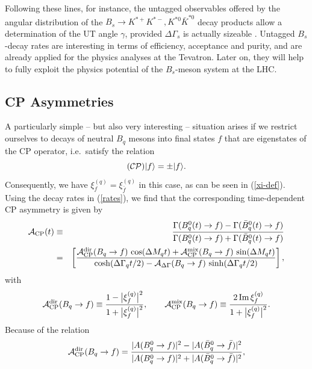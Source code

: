 \documentclass[12pt]{article}
\begin{document}
Following these lines, for instance,  the untagged observables offered by 
the angular distribution of the $B_s\to K^{*+}K^{*-}, K^{*0}\bar K^{*0}$ decay 
products allow a determination of the UT angle $\gamma$, 
provided $\Delta\Gamma_s$ is 
actually sizeable \cite{FD-CP}. Untagged $B_s$-decay rates are interesting in 
terms of efficiency, acceptance and purity, and are already applied for the physics
analyses at the Tevatron. Later on, they will help to fully exploit the physics 
potential of the $B_s$-meson system at the LHC. 

 


%
%
%
\subsection{CP Asymmetries}\label{subsec:CPasym}
%
%
%
A particularly simple -- but also very interesting  -- situation arises 
if we restrict ourselves to decays of neutral $B_q$ mesons 
into final states $f$ that are eigenstates of the CP operator, i.e.\
satisfy the relation 
\begin{equation}\label{CP-eigen}
({\cal CP})|f\rangle=\pm |f\rangle. 
\end{equation}
Consequently, we have $\xi_f^{(q)}=\xi_{\bar f}^{(q)}$ in this case, 
as can be seen in (\ref{xi-def}). Using the decay rates in (\ref{rates}), 
we find that the corresponding time-dependent CP asymmetry is given by
\begin{eqnarray}
{\cal A}_{\rm CP}(t)&\equiv&\frac{\Gamma(B^0_q(t)\to f)-
\Gamma(\bar B^0_q(t)\to f)}{\Gamma(B^0_q(t)\to f)+
\Gamma(\bar B^0_q(t)\to f)}\nonumber\\
&=&\left[\frac{{\cal A}_{\rm CP}^{\rm dir}(B_q\to f)\,\cos(\Delta M_q t)+
{\cal A}_{\rm CP}^{\rm mix}(B_q\to f)\,\sin(\Delta 
M_q t)}{\cosh(\Delta\Gamma_qt/2)-{\cal A}_{\rm 
\Delta\Gamma}(B_q\to f)\,\sinh(\Delta\Gamma_qt/2)}\right],\label{ee6}
\end{eqnarray}
with
\begin{equation}\label{CPV-OBS}
{\cal A}^{\mbox{{\scriptsize dir}}}_{\mbox{{\scriptsize CP}}}(B_q\to f)\equiv
\frac{1-\bigl|\xi_f^{(q)}\bigr|^2}{1+\bigl|\xi_f^{(q)}\bigr|^2},\qquad
{\cal A}^{\mbox{{\scriptsize mix}}}_{\mbox{{\scriptsize
CP}}}(B_q\to f)\equiv\frac{2\,\mbox{Im}\,\xi^{(q)}_f}{1+
\bigl|\xi^{(q)}_f\bigr|^2}.
\end{equation}
Because of the relation
\begin{equation}
{\cal A}^{\mbox{{\scriptsize dir}}}_{\mbox{{\scriptsize CP}}}(B_q\to f)=
\frac{|A(B^0_q\to f)|^2-|A(\bar B^0_q\to \bar f)|^2}{|A(B^0_q\to f)|^2+
|A(\bar B^0_q\to \bar f)|^2},
\end{equation}
\end{document}
